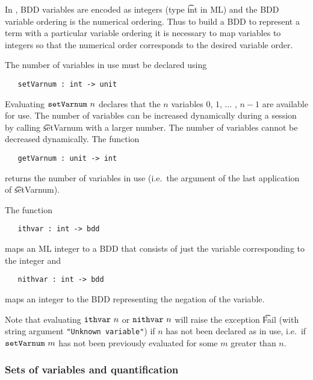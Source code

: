 In \Buddy{}, BDD variables are encoded as integers (type \t{int} in ML) and the BDD variable ordering
is the numerical ordering. Thus to build a BDD to represent a \HOL{} term with a
particular variable ordering it is necessary to map \HOL{} variables to
integers so that the numerical order corresponds to the desired
variable order.

The number of variables in use must be declared using

\begin{verbatim}
   setVarnum : int -> unit
\end{verbatim}

Evaluating $\mbox{\tt setVarnum}~n$ declares that the $n$ variables $0$,
$1$, $\ldots$ , $n{-}1$ are available for use. The number of variables
can be increased dynamically during a session by calling \t{setVarnum}
with a larger number. The number of variables cannot be decreased
dynamically. The function

\begin{verbatim}
   getVarnum : unit -> int
\end{verbatim}

returns the number of variables in use (i.e.~the argument of the last
application of \t{setVarnum}).

The function

\begin{verbatim}
   ithvar : int -> bdd
\end{verbatim}

maps an ML integer to a BDD that consists of just the variable
corresponding to the integer and

\begin{verbatim}
   nithvar : int -> bdd
\end{verbatim}

maps
an integer to the BDD representing the negation of the variable.

Note that evaluating $\mbox{\tt ithvar}~n$ or $\mbox{\tt nithvar}~n$ will raise the exception
\t{Fail} (with string argument \texttt{"Unknown variable"})
if $n$ has not been declared as in use, i.e.~if
$\mbox{\tt setVarnum}~m$ has not been previously evaluated for some $m$
greater than $n$.


\subsubsection{Sets of variables and quantification}\label{varSet}

